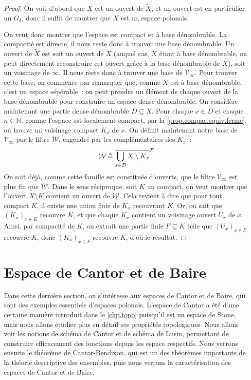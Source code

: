 \begin{proof}
  On voit d'abord que $X$ est un ouvert de $\tilde X$, et un ouvert est en
  particulier un $G_\delta$, donc il suffit de montrer que $\tilde X$ est un
  espace polonais.

  On veut donc montrer que l'espace est compact et à base dénombrable. La
  compacité est directe, il nous reste donc à trouver une base dénombrable. Un
  ouvert de $\tilde X$ est soit un ouvert de $X$ (auquel cas, $X$ étant à base
  dénombrable, on peut directement reconstruire cet ouvert grâce à la base
  dénombrable de $X$), soit un voisinage de $\infty$. Il nous reste donc à
  trouver une base de $\mathcal V_\infty$. Pour trouver cette base, on commence
  par remarquer que, comme $X$ est à base dénombrable, c'est un espace
  sépérable~: on peut prendre un élément de chaque ouvert de la base dénombrable
  pour construire un espace dense dénombrable. On considère maintenant une
  partie dense dénombrable $D \subseteq X$. Pour chaque $x \in D$ et chaque
  $n \in \mathbb N$, comme l'espace est localement compact, par la
  \cref{prop.compac.equiv.ferme}, on trouve un voisinage compact $K_x$ de
  $x$. On définit maintenant notre base de $\mathcal V_\infty$ par le filtre
  $\mathcal W$, engendré par les complémentaires des $K_x$~:
  \[\mathcal W \triangleq \overline{\bigcup_{x \in D} X\setminus K_{x}}^{\mathcal F}\]
  On sait déjà, comme cette famille est constituée d'ouverts, que le filtre
  $\mathcal V_\infty$ est plus fin que $\mathcal W$. Dans le sens réciproque,
  soit $K$ un compact, on veut montrer que l'ouvert $X\setminus K$ contient un
  ouvert de $\mathcal W$. Cela revient à dire que pour tout compact $K$, il
  existe une union finie de $K_x$ recouvrant $K$. Or, on sait que
  $(K_x)_{x \in K}$ recouvre $K$, et que chaque $K_x$ contient un voisinage
  ouvert $U_x$ de $x$. Ainsi, par compacité de $K$, on extrait une partie finie
  $F\subseteq K$ telle que $(U_x)_{x \in F}$ recouvre $K$, donc $(K_x)_{x \in F}$
  recouvre $K$, d'où le résultat.
\end{proof}

\section{Espace de Cantor et de Baire}

Dans cette dernière section, on s'intéresse aux espaces de Cantor et de Baire,
qui sont des exemples essentiels d'espaces polonais. L'espace de Cantor a été
d'une certaine manière introduit dans le \cref{chp.topo} puisqu'il est un espace
de Stone, mais nous allons étudier plus en détail ses propriétés topologiques.
Nous allons voir les notions de schéma de Cantor et de schéma de Lusin,
permettant de construire efficacement des fonctions depuis les espace
respectifs. Nous verrons ensuite le théorème de Cantor-Bendixon, qui est un des
théorèmes importants de la théorie descriptive des ensembles, puis nous verrons
la caractérisation des espaces de Cantor et de Baire.

